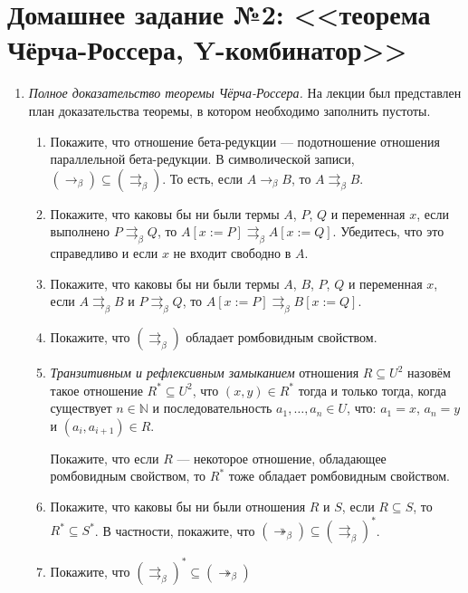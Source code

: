 \documentclass[10pt,a4paper,oneside]{article}
\begin{document}
\section*{Домашнее задание №2: <<теорема Чёрча-Россера, Y-комбинатор>>}

\begin{enumerate}
\item \emph{Полное доказательство теоремы Чёрча-Россера.}
На лекции был представлен план доказательства теоремы, в котором необходимо заполнить
пустоты. 
\begin{enumerate}
\item Покажите, что отношение бета-редукции --- подотношение отношения параллельной бета-редукции.
В символической записи, $(\rightarrow_\beta) \subseteq (\rightrightarrows_\beta)$.
То есть, если $A \rightarrow_\beta B$, то $A \rightrightarrows_\beta B$.

\item Покажите, что каковы бы ни были термы $A$, $P$, $Q$ и переменная $x$, 
если выполнено $P \rightrightarrows_\beta Q$, то $A [x := P] \rightrightarrows_\beta A [x := Q]$.
Убедитесь, что это справедливо и если $x$ не входит свободно в $A$.

\item Покажите, что каковы бы ни были термы $A$, $B$, $P$, $Q$ и переменная $x$, 
если $A \rightrightarrows_\beta B$ и $P \rightrightarrows_\beta Q$, то 
$A[x := P] \rightrightarrows_\beta B[x := Q]$.

\item Покажите, что $(\rightrightarrows_\beta)$ обладает ромбовидным свойством.

\item \emph{Транзитивным и рефлексивным замыканием} отношения $R \subseteq U^2$ назовём такое отношение
$R^* \subseteq U^2$, что $(x,y) \in R^*$ тогда и только тогда, когда существует $n\in \mathbb{N}$ и последовательность
$a_1,\dots,a_n \in U$, что: $a_1 = x$, $a_n = y$ и $(a_i,a_{i+1}) \in R$.

Покажите, что если $R$ --- некоторое отношение,
обладающее ромбовидным свойством, то $R^*$ тоже обладает
ромбовидным свойством.
\item Покажите, что каковы бы ни были отношения $R$ и $S$, если $R \subseteq S$, то $R^* \subseteq S^*$. 
В частности, покажите, что $(\twoheadrightarrow_\beta) \subseteq (\rightrightarrows_\beta)^*$.

\item Покажите, что $(\rightrightarrows_\beta)^* \subseteq (\twoheadrightarrow_\beta)$
\end{enumerate}


\end{enumerate}
\end{document}
